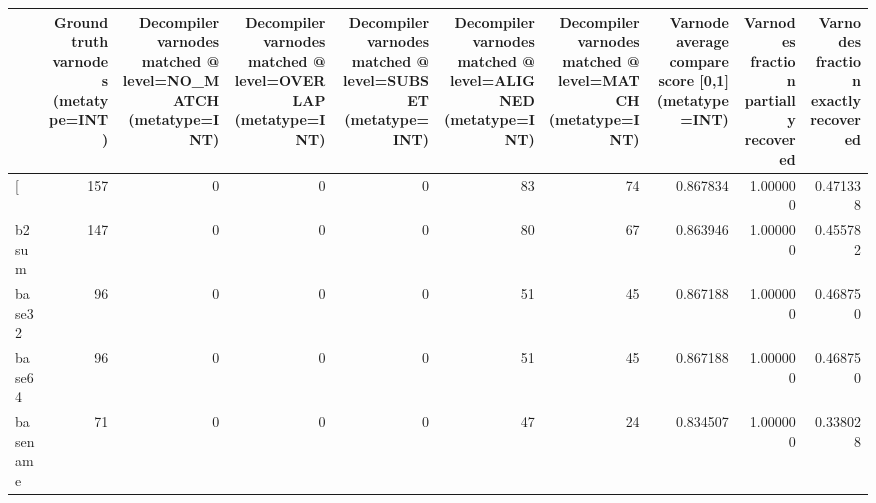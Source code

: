 \begin{tabular}{lrrrrrrrrr}
\toprule
{} &  Ground truth varnodes (metatype=INT) &  Decompiler varnodes matched @ level=NO\_MATCH (metatype=INT) &  Decompiler varnodes matched @ level=OVERLAP (metatype=INT) &  Decompiler varnodes matched @ level=SUBSET (metatype=INT) &  Decompiler varnodes matched @ level=ALIGNED (metatype=INT) &  Decompiler varnodes matched @ level=MATCH (metatype=INT) &  Varnode average compare score [0,1] (metatype=INT) &  Varnodes fraction partially recovered &  Varnodes fraction exactly recovered \\
\midrule
[         &                                   157 &                                                  0 &                                                  0 &                                                  0 &                                                 83 &                                                 74 &                                           0.867834 &                               1.000000 &                             0.471338 \\
b2sum     &                                   147 &                                                  0 &                                                  0 &                                                  0 &                                                 80 &                                                 67 &                                           0.863946 &                               1.000000 &                             0.455782 \\
base32    &                                    96 &                                                  0 &                                                  0 &                                                  0 &                                                 51 &                                                 45 &                                           0.867188 &                               1.000000 &                             0.468750 \\
base64    &                                    96 &                                                  0 &                                                  0 &                                                  0 &                                                 51 &                                                 45 &                                           0.867188 &                               1.000000 &                             0.468750 \\
basename  &                                    71 &                                                  0 &                                                  0 &                                                  0 &                                                 47 &                                                 24 &                                           0.834507 &                               1.000000 &                             0.338028 \\

\end{tabular}
